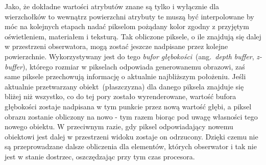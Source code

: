 Jako, że dokładne wartości atrybutów znane są tylko i wyłącznie dla wierzchołków to wewnątrz powierzchni atrybuty te muszą być interpolowane by móc na kolejnych etapach nadać pikselom pożądany kolor zgodny z przyjętym oświetleniem, materiałem i teksturą. Tak obliczone piksele, o ile znajdują się dalej w przestrzeni obserwatora, mogą zostać jeszcze nadpisane przez kolejne powierzchnie. Wykorzystywany jest do tego \textit{bufor głębokości}~(ang.~\textit{depth buffer}, \textit{z-buffer}), którego rozmiar w pikselach odpowiada generowanemu obrazowi, zaś same piksele przechowują informację o aktualnie najbliższym położeniu. Jeśli aktualnie przetwarzany obiekt~(płaszczyzna) dla danego piksela znajduje się bliżej niż wszystko, co do tej pory zostało wyrenderowane, wartość bufora głębokości zostaje nadpisana w tym punkcie przez nową wartość głębi, a piksel obrazu zostanie obliczony na nowo - tym razem biorąc pod uwagę własności tego nowego obiektu. W przeciwnym razie, gdy piksel odpowiadający nowemu obiektowi jest dalej w przestrzeni widoku zostaje on odrzucony. Dzięki czemu nie są przeprowadzane dalsze obliczenia dla elementów, których obserwator i tak nie jest w stanie dostrzec, oszczędzając przy tym czas procesora.

